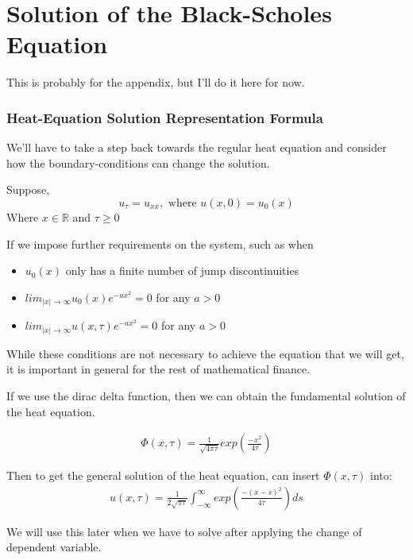 \documentclass{article}
\begin{document}
\section*{Solution of the Black-Scholes Equation}

This is probably for the appendix, but I'll do it here for now.
\subsubsection*{Heat-Equation Solution Representation Formula}

We'll have to take a step back towards the regular heat equation and consider how the boundary-conditions can 
change the solution. 

Suppose,
\begin{equation}
    u_{\tau} = u_{xx}, \text{ where }u(x,0) = u_{0}(x)
\end{equation}
Where $x \in \mathbb{R} $ and $\tau \ge 0$

If we impose further requirements on the system, such as when 
\begin{itemize}
\item $u_0(x)$ only has a finite number of jump discontinuities
\item $lim_{|x| \to \infty} u_{0}(x)e^{-ax^2} = 0$  for any $a > 0$ 
\item $lim_{|x| \to \infty} u(x, \tau)e^{-ax^2} = 0$  for any $a > 0$ 
\end{itemize} 
While these conditions are not necessary to achieve the equation that we will get, it is important in general for the rest of mathematical finance.


If we use the dirac delta function, then we can obtain the fundamental solution of the heat equation. 

\begin{align*}
    \Phi(x,\tau) = \frac{1}{\sqrt{4\pi \tau}} exp(\frac{-x^2}{4\tau})
\end{align*}

Then to get the general solution of the heat equation, can insert $\Phi(x, \tau)$ into:
\begin{align*}
    u(x, \tau) = \frac{1}{2\sqrt{\pi \tau}} \int_{-\infty}^{\infty} exp(\frac{-(x-s)^2}{4\tau}) ds
\end{align*}

We will use this later when we have to solve after applying the change of dependent variable.
\end{document}
